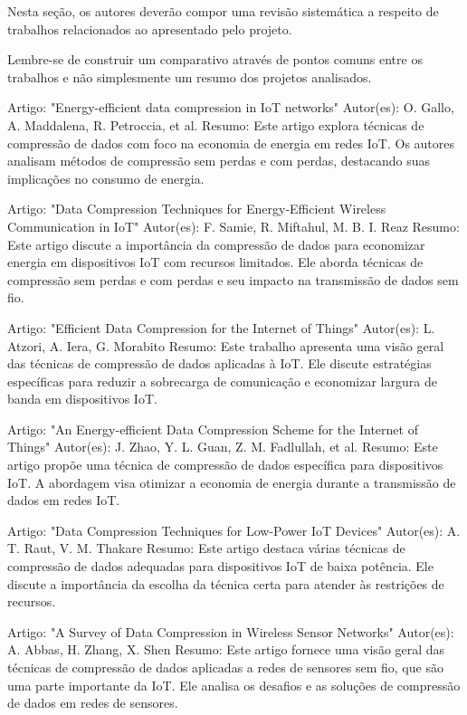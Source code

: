 Nesta seção, os autores deverão compor uma revisão sistemática a respeito de trabalhos relacionados ao apresentado pelo projeto.

Lembre-se de construir um comparativo através de pontos comuns entre os trabalhos e não simplesmente um resumo dos projetos analisados.

Artigo: "Energy-efficient data compression in IoT networks"
    Autor(es): O. Gallo, A. Maddalena, R. Petroccia, et al.
    Resumo: Este artigo explora técnicas de compressão de dados com foco na economia de energia em redes IoT. Os autores analisam métodos de compressão sem perdas e com perdas, destacando suas implicações no consumo de energia.

Artigo: "Data Compression Techniques for Energy-Efficient Wireless Communication in IoT"
    Autor(es): F. Samie, R. Miftahul, M. B. I. Reaz
    Resumo: Este artigo discute a importância da compressão de dados para economizar energia em dispositivos IoT com recursos limitados. Ele aborda técnicas de compressão sem perdas e com perdas e seu impacto na transmissão de dados sem fio.

Artigo: "Efficient Data Compression for the Internet of Things"
    Autor(es): L. Atzori, A. Iera, G. Morabito
    Resumo: Este trabalho apresenta uma visão geral das técnicas de compressão de dados aplicadas à IoT. Ele discute estratégias específicas para reduzir a sobrecarga de comunicação e economizar largura de banda em dispositivos IoT.

Artigo: "An Energy-efficient Data Compression Scheme for the Internet of Things"
    Autor(es): J. Zhao, Y. L. Guan, Z. M. Fadlullah, et al.
    Resumo: Este artigo propõe uma técnica de compressão de dados específica para dispositivos IoT. A abordagem visa otimizar a economia de energia durante a transmissão de dados em redes IoT.

Artigo: "Data Compression Techniques for Low-Power IoT Devices"
    Autor(es): A. T. Raut, V. M. Thakare
    Resumo: Este artigo destaca várias técnicas de compressão de dados adequadas para dispositivos IoT de baixa potência. Ele discute a importância da escolha da técnica certa para atender às restrições de recursos.

Artigo: "A Survey of Data Compression in Wireless Sensor Networks"
    Autor(es): A. Abbas, H. Zhang, X. Shen
    Resumo: Este artigo fornece uma visão geral das técnicas de compressão de dados aplicadas a redes de sensores sem fio, que são uma parte importante da IoT. Ele analisa os desafios e as soluções de compressão de dados em redes de sensores.

